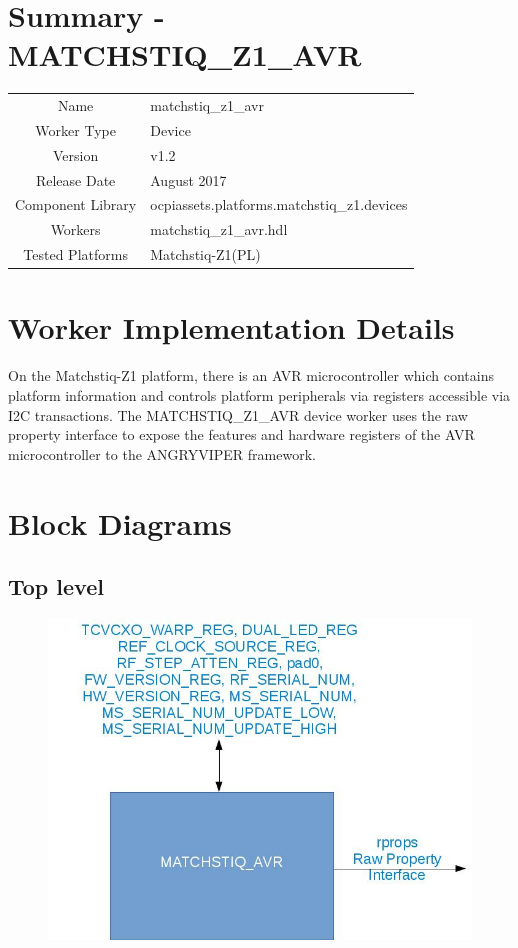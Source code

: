 \documentclass{article}
\author{} %
\date{Version \docVersion} %
\title{\docTitle}
\def\docVersion{1.2}
\def\comp{matchstiq\_z1\_avr}
\def\Comp{MATCHSTIQ\_Z1\_AVR}
\begin{document}
\section*{Summary - \Comp}
\begin{tabular}{|c|M{13.5cm}|}
	\hline
	                  &                                        			\\
	\hline
	Name              & \comp                                  			\\
	\hline
	Worker Type       & Device                                 			\\
	\hline
	Version           & v\docVersion \\
	\hline
	Release Date      & August 2017 \\
	\hline
	Component Library & ocpiassets.platforms.matchstiq\_z1.devices		\\
	\hline
	Workers           & \comp.hdl                              			\\
	\hline
	Tested Platforms  & Matchstiq-Z1(PL)                       			\\
	\hline
\end{tabular}

\section*{Worker Implementation Details}
On the Matchstiq-Z1 platform, there is an AVR microcontroller which contains platform information and controls platform peripherals via registers accessible via I2C transactions. The \Comp{} device worker uses the raw property interface to expose the features and hardware registers of the AVR microcontroller to the ANGRYVIPER framework.

\section*{Block Diagrams}
\subsection*{Top level}
\begin{figure}[ht]
	\centerline{\includegraphics[scale=0.4]{matchstiq_z1_avr_top_level}}
	\label{fig:tb}
\end{figure}
\end{document}

